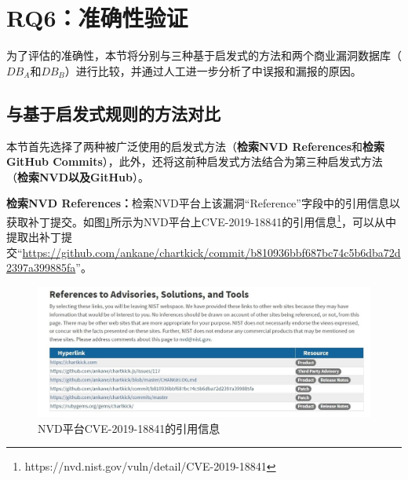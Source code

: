 \section{RQ6：准确性验证}\label{sec:accuracy-evaluation}

为了评估\tool 的准确性，本节将\tool 分别与三种基于启发式的方法和两个商业漏洞数据库（$DB_A$和$DB_B$）进行比较，并通过人工进一步分析了\tool 中误报和漏报的原因。

\subsection{与基于启发式规则的方法对比}
本节首先选择了两种被广泛使用的启发式方法（\textbf{检索NVD References}和\textbf{检索GitHub Commits}），此外，还将这前种启发式方法结合为第三种启发式方法（\textbf{检索NVD以及GitHub}）。

\textbf{检索NVD References：}检索NVD平台上该漏洞“Reference”字段中的引用信息以获取补丁提交\cite{duan2019automating,li2016vulpecker,li2018vuldeepecker}。如图\ref{fig:CVE-2019-18841}所示为NVD平台上CVE-2019-18841的引用信息\footnote{https://nvd.nist.gov/vuln/detail/CVE-2019-18841}，可以从中提取出补丁提交“\url{https://github.com/ankane/chartkick/commit/b810936bbf687bc74c5b6dba72d2397a399885fa}”。
\begin{figure}[h]
    \centering
    \includegraphics[scale=0.44]{fig/NVD-2019-18841}
    \caption{NVD平台CVE-2019-18841的引用信息}\label{fig:CVE-2019-18841}
\end{figure}

